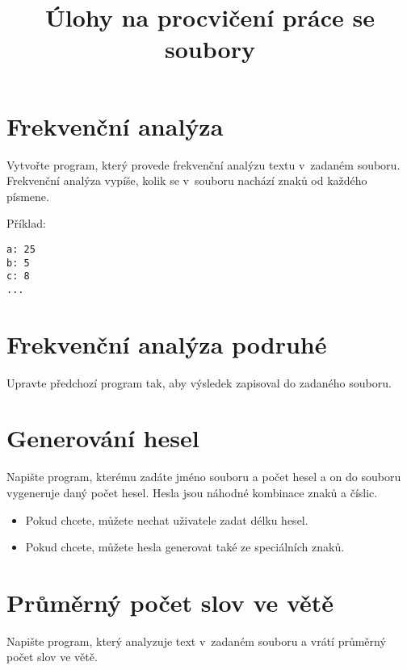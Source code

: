 \documentclass[12pt,a4paper]{article}
\begin{document}
\pagestyle{plain}
\title{Úlohy na procvičení práce se soubory}
\date{\vspace{-10ex}}
\setlength{\droptitle}{-6em}
\maketitle

\setlength\parindent{0pt}

\section{Frekvenční analýza}

Vytvořte program, který provede frekvenční analýzu textu v~zadaném souboru.
Frekvenční analýza vypíše, kolik se v~souboru nachází znaků od každého písmene.

Příklad:

\begin{verbatim}
a: 25
b: 5
c: 8
...
\end{verbatim}

\section{Frekvenční analýza podruhé}

Upravte předchozí program tak, aby výsledek zapisoval do zadaného souboru.

\section{Generování hesel}

Napište program, kterému zadáte jméno souboru a počet hesel a on do souboru
vygeneruje daný počet hesel. Hesla jsou náhodné kombinace znaků a číslic.

\begin{itemize}[noitemsep,nolistsep]
	\item Pokud chcete, můžete nechat uživatele zadat délku hesel.
	\item Pokud chcete, můžete hesla generovat také ze speciálních znaků.
\end{itemize}

\section{Průměrný počet slov ve větě}

Napište program, který analyzuje text v~zadaném souboru a vrátí průměrný počet
slov ve větě.
\end{document}
